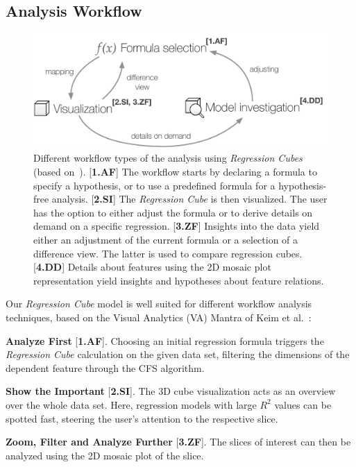 \documentclass[journal]{style/vgtc} 			          %
\begin{document}
\subsection{Analysis Workflow} \label{sec:Workflow}
\begin{figure}[htb]
 \centering
 \includegraphics[width=1.0\linewidth]{figures/workflow}
 \caption{
 Different workflow types of the analysis using \emph{Regression Cubes} (based on~\cite{Keim}).
 [\textbf{1.AF}] The workflow starts by declaring a formula to specify a hypothesis, or to use a predefined formula for a hypothesis-free analysis.
 [\textbf{2.SI}] The \emph{Regression Cube} is then visualized.
 The user has the option to either adjust the formula or to derive details on demand on a specific regression.
 [\textbf{3.ZF}] Insights into the data yield either an adjustment of the current formula or a selection of a difference view.
 The latter is used to compare regression cubes.
 [\textbf{4.DD}] Details about features using the 2D mosaic plot representation yield insights and hypotheses about feature relations.
 }
  \label{fig:Workflow}
\end{figure}
Our \emph{Regression Cube} model is well suited for different workflow analysis techniques, based on the Visual Analytics (VA) Mantra of Keim et al.~\cite{Keim}:

\textbf{Analyze First} [\textbf{1.AF}]. Choosing an initial regression formula triggers the \emph{Regression Cube} calculation on the given data set, filtering the dimensions of the dependent feature through the CFS algorithm.

\textbf{Show the Important} [\textbf{2.SI}]. The 3D cube visualization acts as an overview over the whole data set.
Here, regression models with large $R^2$ values can be spotted fast, steering the user's attention to the respective slice.

\textbf{Zoom, Filter and Analyze Further} [\textbf{3.ZF}]. The slices of interest can then be analyzed using the 2D mosaic plot of the slice.
\end{document}
